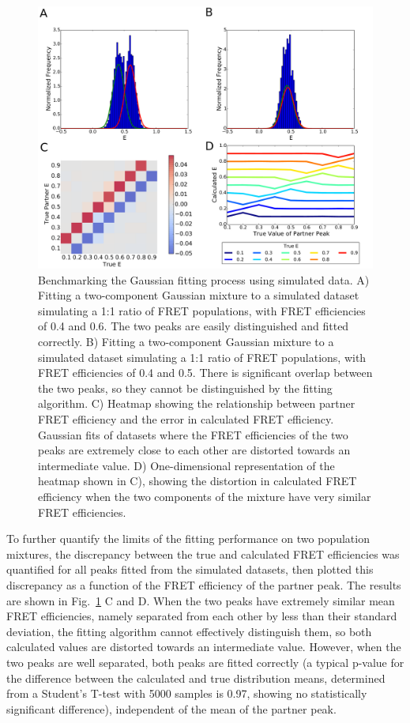 \begin{figure}[!ht]
   \begin{center}
      \includegraphics*[clip=true, width=6in]{pyFRET/benchmarking.pdf}
      \caption{Benchmarking the Gaussian fitting process using simulated data. A) Fitting a two-component Gaussian mixture to a simulated dataset simulating a 1:1 ratio of FRET populations, with FRET efficiencies of 0.4 and 0.6. The two peaks are easily distinguished and fitted correctly. B) Fitting a two-component Gaussian mixture to a simulated dataset simulating a 1:1 ratio of FRET populations, with FRET efficiencies of 0.4 and 0.5. There is significant overlap between the two peaks, so they cannot be distinguished by the fitting algorithm. C) Heatmap showing the relationship between partner FRET efficiency and the error in calculated FRET efficiency. Gaussian fits of datasets where the FRET efficiencies of the two peaks are extremely close to each other are distorted towards an intermediate value. D) One-dimensional representation of the heatmap shown in C), showing the distortion in calculated FRET efficiency when the two components of the mixture have very similar FRET efficiencies.}
      \label{fig:fig_benchmarking}
   \end{center}
\end{figure}

To further quantify the limits of the fitting performance on two population mixtures, the discrepancy between the true and calculated FRET efficiencies was quantified for all peaks fitted from the simulated datasets, then plotted this discrepancy as a function of the FRET efficiency of the partner peak. The results are shown in Fig.~\ref{fig:fig_benchmarking} C and D. When the two peaks have extremely similar mean FRET efficiencies, namely separated from each other by less than their standard deviation, the fitting algorithm cannot effectively distinguish them, so both calculated values are distorted towards an intermediate value. However, when the two peaks are well separated, both peaks are fitted correctly (a typical p-value for the difference between the calculated and true distribution means, determined from a Student's T-test with 5000 samples is 0.97, showing no statistically significant difference), independent of the mean of the partner peak.

